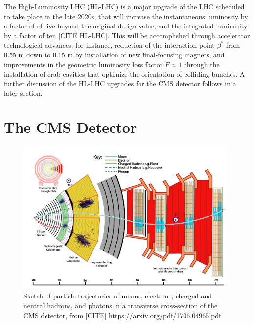 The High-Luminosity LHC (HL-LHC) is a major upgrade of the LHC scheduled to take place in the late 2020s, that will increase the instantaneous luminosity by a factor of of five beyond the original design value, and the integrated luminosity by a factor of ten [CITE HL-LHC]. This will be accomplished through accelerator technological advances: for instance, reduction of the interaction point $\beta^*$ from 0.55 m down to 0.15 m by installation of new final-focusing magnets, and improvements in the geometric luminosity loss factor $F \approx 1$ through the installation of crab cavities that optimize the orientation of colliding bunches. A further discussion of the HL-LHC upgrades for the CMS detector follows in a later section.

\section{The CMS Detector}
\label{section:cms-detector}

\begin{figure}[ht]
    \centering
    \includegraphics[width=11cm]{figures/ch-2-cern-cms/sketch-cms-particle-interactions.png}
    \caption{Sketch of particle trajectories of muons, electrons, charged and neutral hadrons, and photons in a transverse cross-section of the CMS detector, from [CITE] https://arxiv.org/pdf/1706.04965.pdf.}
    \label{fig:sketch-cms-particle-interactions}
\end{figure}

